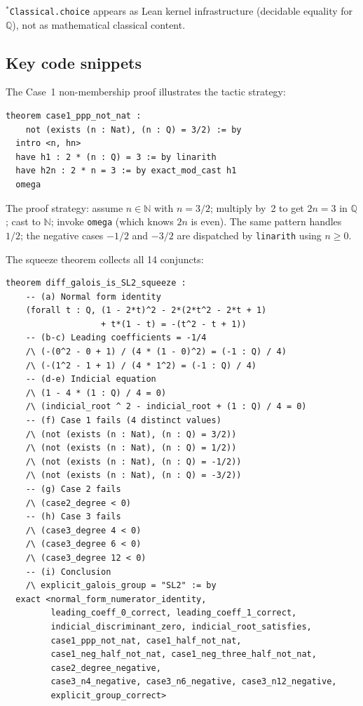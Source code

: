 \documentclass[11pt]{article}
\theoremstyle{plain}
\theoremstyle{definition}
\theoremstyle{remark}
\newcommand{\N}{\mathbb{N}}
\newcommand{\Q}{\mathbb{Q}}
\begin{document}
\noindent
${}^*$\texttt{Classical.choice} appears as Lean kernel infrastructure (decidable equality for $\Q$), not as mathematical classical content.

\subsection{Key code snippets}

The Case~1 non-membership proof illustrates the tactic strategy:

\begin{lstlisting}[caption={Kovacic Case 1: $3/2 \notin \N$ (KovacicData.lean)}]
theorem case1_ppp_not_nat :
    not (exists (n : Nat), (n : Q) = 3/2) := by
  intro <n, hn>
  have h1 : 2 * (n : Q) = 3 := by linarith
  have h2n : 2 * n = 3 := by exact_mod_cast h1
  omega
\end{lstlisting}

\noindent
The proof strategy: assume $n \in \N$ with $n = 3/2$; multiply by~2 to get $2n = 3$ in $\Q$; cast to $\N$; invoke \texttt{omega} (which knows $2n$ is even).
The same pattern handles $1/2$; the negative cases $-1/2$ and $-3/2$ are dispatched by \texttt{linarith} using $n \geq 0$.

The squeeze theorem collects all 14 conjuncts:

\begin{lstlisting}[caption={The squeeze theorem (Paper82\_DiffGalois.lean)}]
theorem diff_galois_is_SL2_squeeze :
    -- (a) Normal form identity
    (forall t : Q, (1 - 2*t)^2 - 2*(2*t^2 - 2*t + 1)
                   + t*(1 - t) = -(t^2 - t + 1))
    -- (b-c) Leading coefficients = -1/4
    /\ (-(0^2 - 0 + 1) / (4 * (1 - 0)^2) = (-1 : Q) / 4)
    /\ (-(1^2 - 1 + 1) / (4 * 1^2) = (-1 : Q) / 4)
    -- (d-e) Indicial equation
    /\ (1 - 4 * (1 : Q) / 4 = 0)
    /\ (indicial_root ^ 2 - indicial_root + (1 : Q) / 4 = 0)
    -- (f) Case 1 fails (4 distinct values)
    /\ (not (exists (n : Nat), (n : Q) = 3/2))
    /\ (not (exists (n : Nat), (n : Q) = 1/2))
    /\ (not (exists (n : Nat), (n : Q) = -1/2))
    /\ (not (exists (n : Nat), (n : Q) = -3/2))
    -- (g) Case 2 fails
    /\ (case2_degree < 0)
    -- (h) Case 3 fails
    /\ (case3_degree 4 < 0)
    /\ (case3_degree 6 < 0)
    /\ (case3_degree 12 < 0)
    -- (i) Conclusion
    /\ explicit_galois_group = "SL2" := by
  exact <normal_form_numerator_identity,
         leading_coeff_0_correct, leading_coeff_1_correct,
         indicial_discriminant_zero, indicial_root_satisfies,
         case1_ppp_not_nat, case1_half_not_nat,
         case1_neg_half_not_nat, case1_neg_three_half_not_nat,
         case2_degree_negative,
         case3_n4_negative, case3_n6_negative, case3_n12_negative,
         explicit_group_correct>
\end{lstlisting}
\end{document}

